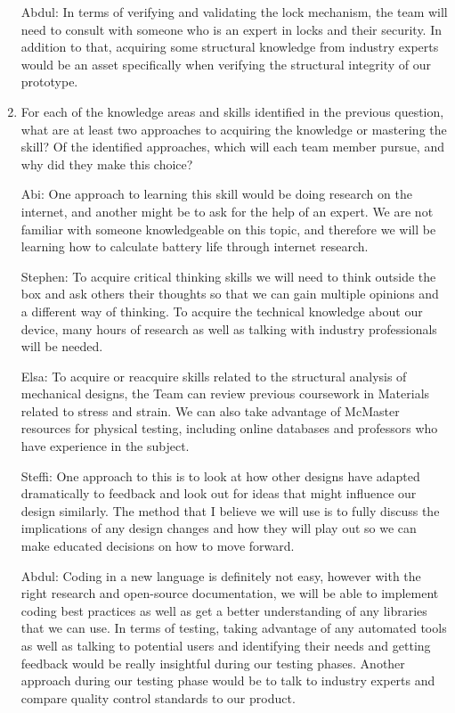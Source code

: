 \documentclass[12pt, titlepage]{article}
\begin{document}
\begin{enumerate}
Abdul: In terms of verifying and validating the lock mechanism, the team will need to consult with someone who is an expert in locks and their security. In addition to that, acquiring some structural knowledge from industry experts would be an asset specifically when verifying the structural integrity of our prototype. 

  \item For each of the knowledge areas and skills identified in the previous
  question, what are at least two approaches to acquiring the knowledge or
  mastering the skill?  Of the identified approaches, which will each team
  member pursue, and why did they make this choice?

Abi: One approach to learning this skill would be doing research on the internet, and another might be to ask for the help of an expert. We are not familiar with someone knowledgeable on this topic, and therefore we will be learning how to calculate battery life through internet research. 

Stephen: To acquire critical thinking skills we will need to think outside the box and ask others their thoughts so that we can gain multiple opinions and a different way of thinking. To acquire the technical knowledge about our device, many hours of research as well as talking with industry professionals will be needed.

Elsa: To acquire or reacquire skills related to the structural analysis of mechanical designs, the Team can review previous coursework in Materials related to stress and strain. We can also take advantage of McMaster resources for physical testing, including online databases and professors who have experience in the subject. 

Steffi: One approach to this is to look at how other designs have adapted dramatically to feedback and look out for ideas that might influence our design similarly.  The method that I believe we will use is to fully discuss the implications of any design changes and how they will play out so we can make educated decisions on how to move forward.

Abdul: Coding in a new language is definitely not easy, however with the right research and open-source documentation, we will be able to implement coding best practices as well as get a better understanding of any libraries that we can use. In terms of testing, taking advantage of any automated tools as well as talking to potential users and identifying their needs and getting feedback would be really insightful during our testing phases. Another approach during our testing phase would be to talk to industry experts and compare quality control standards to our product. 

\end{enumerate}
\end{document}
